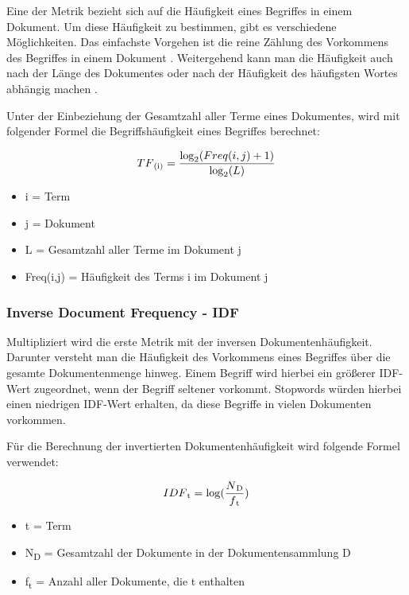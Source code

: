 Eine der Metrik bezieht sich auf die Häufigkeit eines Begriffes in einem Dokument. Um diese Häufigkeit zu bestimmen, gibt es verschiedene Möglichkeiten. Das einfachste Vorgehen ist die reine Zählung des Vorkommens des Begriffes in einem Dokument \cite{BrunoStecanella.2019}. Weitergehend kann man die Häufigkeit auch nach der Länge des Dokumentes oder nach der Häufigkeit des häufigsten Wortes abhängig machen \cite{BrunoStecanella.2019}.

Unter der Einbeziehung der Gesamtzahl aller Terme eines Dokumentes, wird mit folgender Formel \cite{JensFrohlich.2020} die Begriffshäufigkeit eines Begriffes berechnet:

\begin{equation}
    \nonumber
    TF\textsubscript{(i)} = \frac{\log_2 (Freq(i,j) + 1)}{\log_2 (L)}
\end{equation}

\begin{itemize}
    \item i = Term
    \item j = Dokument
    \item L = Gesamtzahl aller Terme im Dokument j
    \item Freq(i,j) = Häufigkeit des Terms i im Dokument j
\end{itemize}

\subsubsection{Inverse Document Frequency - IDF}

Multipliziert wird die erste Metrik mit der inversen Dokumentenhäufigkeit. Darunter versteht man die Häufigkeit des Vorkommens eines Begriffes über die gesamte Dokumentenmenge hinweg. Einem Begriff wird hierbei ein größerer IDF-Wert zugeordnet, wenn der Begriff seltener vorkommt. Stopwords würden hierbei einen niedrigen IDF-Wert erhalten, da diese Begriffe in vielen Dokumenten vorkommen.

Für die Berechnung der invertierten Dokumentenhäufigkeit wird folgende Formel \cite{JensFrohlich.2020} verwendet: 

\begin{equation}
    \nonumber
    IDF\textsubscript{t} = \log (\frac{N\textsubscript{D}}{f\textsubscript{t}})
\end{equation}

\begin{itemize}
    \item t = Term
    \item N\textsubscript{D} = Gesamtzahl der Dokumente in der Dokumentensammlung D
    \item f\textsubscript{t} = Anzahl aller Dokumente, die t enthalten
\end{itemize}

